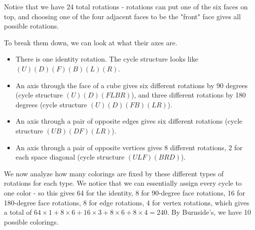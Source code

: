 \documentclass[11pt,twosided]{article}
\begin{document}
\begin{solution}
Notice that we have 24 total rotations - rotations can put one of the six faces on top, and choosing one of the four adjacent faces to be the "front" face gives all possible rotations. 

To break them down, we can look at what their axes are. 
\begin{itemize}
\item There is one identity rotation. The cycle structure looks like $(U)(D)(F)(B)(L)(R)$. 
\item An axis through the face of a cube gives six different rotations by 90 degrees (cycle structure $(U)(D)(FLBR)$), and three different rotations by 180 degrees (cycle structure $(U)(D)(FB)(LR)$). 
\item An axis through a pair of opposite edges gives six different rotations (cycle structure $(UB)(DF)(LR)$). 
\item An axis through a pair of opposite vertices gives 8 different rotations, 2 for each space diagonal (cycle structure $(ULF)(BRD)$).
\end{itemize}

We now analyze how many colorings are fixed by these different types of rotations for each type. We notice that we can essentially assign every cycle to one color - so this gives 64 for the identity, 8 for 90-degree face rotations, 16 for 180-degree face rotations, 8 for edge rotations, 4 for vertex rotations, which gives a total of $64 \times 1 + 8 \times 6 + 16 \times 3 + 8 \times 6 + 8 \times 4 = 240$. By Burnside's, we have 10 possible colorings. 
\end{solution}
\end{document}
